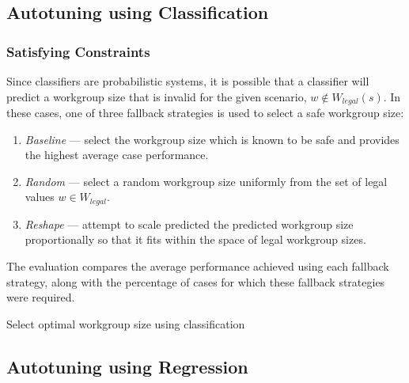 \subsection{Autotuning using Classification}




\subsubsection{Satisfying Constraints}

Since classifiers are probabilistic systems, it is possible that a
classifier will predict a workgroup size that is invalid for the given
scenario, $w \not\in W_{legal}(s)$. In these cases, one of three
fallback strategies is used to select a safe workgroup size:

\begin{enumerate}
\item \emph{Baseline} --- select the workgroup size which is known to be
  safe and provides the highest average case performance.
\item \emph{Random} --- select a random workgroup size uniformly from
  the set of legal values $w \in W_{legal}$.
\item \emph{Reshape} --- attempt to scale predicted the predicted
  workgroup size proportionally so that it fits within the space of
  legal workgroup sizes.
\end{enumerate}

The evaluation compares the average performance achieved using each
fallback strategy, along with the percentage of cases for which these
fallback strategies were required.

\begin{algorithm}

\caption{Select optimal workgroup size using classification}
\label{alg:autotune-classification}
\end{algorithm}


\subsection{Autotuning using Regression}

